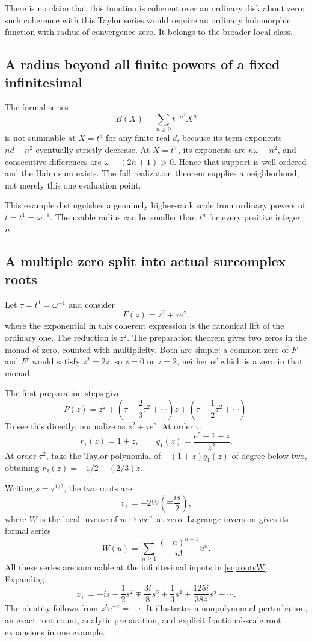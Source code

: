 \documentclass[11pt,a4paper]{article}
\numberwithin{equation}{section}
\theoremstyle{definition}
\theoremstyle{remark}
\begin{document}
There is no claim that this function is coherent over an ordinary disk about zero: such coherence with this Taylor series would require an ordinary holomorphic function with radius of convergence zero. It belongs to the broader local class.

\subsection{A radius beyond all finite powers of a fixed infinitesimal}
The formal series
\[
 B(X)=\sum_{n\geq0}t^{-n^2}X^n
\]
is not summable at $X=t^d$ for any finite real $d$, because its term exponents $nd-n^2$ eventually strictly decrease. At $X=t^\omega$, its exponents are
$n\omega-n^2$, and consecutive differences are $\omega-(2n+1)>0$. Hence that support is well ordered and the Hahn sum exists. The full realization theorem supplies a neighborhood, not merely this one evaluation point.

This example distinguishes a genuinely higher-rank scale from ordinary powers of $t=t^1=\omega^{-1}$. The usable radius can be smaller than $t^n$ for every positive integer $n$.

\subsection{A multiple zero split into actual surcomplex roots}
Let $\tau=t^1=\omega^{-1}$ and consider
\[
 F(z)=z^2+\tau e^z,
\]
where the exponential in this coherent expression is the canonical lift of the ordinary one. The reduction is $z^2$. The preparation theorem gives two zeros in the monad of zero, counted with multiplicity. Both are simple: a common zero of $F$ and $F'$ would satisfy $z^2=2z$, so $z=0$ or $z=2$, neither of which is a zero in that monad.

The first preparation steps give
\begin{equation}
\label{eq:prepexample}
 P(z)=z^2+
 \left(\tau-\frac23\tau^2+\cdots\right)z
 +\left(\tau-\frac12\tau^2+\cdots\right).
\end{equation}
To see this directly, normalize as $z^2+\tau e^z$. At order $\tau$,
\[
 r_1(z)=1+z,\qquad q_1(z)=\frac{e^z-1-z}{z^2}.
\]
At order $\tau^2$, take the Taylor polynomial of $-(1+z)q_1(z)$ of degree below two, obtaining $r_2(z)=-1/2-(2/3)z$.

Writing $s=\tau^{1/2}$, the two roots are
\begin{equation}
\label{eq:rootsW}
 z_\pm=-2W\!\left(\mp\frac{i s}{2}\right),
\end{equation}
where $W$ is the local inverse of $w\mapsto we^w$ at zero. Lagrange inversion gives its formal series
\[
 W(u)=\sum_{n\geq1}\frac{(-n)^{n-1}}{n!}u^n.
\]
All these series are summable at the infinitesimal inputs in \eqref{eq:rootsW}. Expanding,
\[
 z_\pm=\pm is-\frac12s^2\mp\frac{3i}{8}s^3
       +\frac13s^4\pm\frac{125i}{384}s^5+\cdots.
\]
The identity follows from $z^2e^{-z}=-\tau$. It illustrates a nonpolynomial perturbation, an exact root count, analytic preparation, and explicit fractional-scale root expansions in one example.
\end{document}
